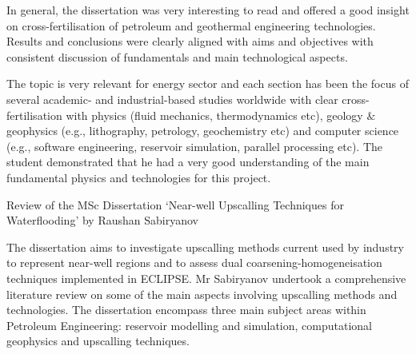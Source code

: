 \documentclass[14pt,twoside]{report}
\begin{document}
In general, the dissertation was very interesting to read and offered a good insight on cross-fertilisation of petroleum and geothermal engineering technologies. Results and conclusions were clearly aligned with aims and objectives with consistent discussion of fundamentals and main technological aspects. 

The topic is very relevant for energy sector and each section has been the focus of several academic- and industrial-based studies worldwide with clear cross-fertilisation with physics (fluid mechanics, thermodynamics etc), geology $\&$ geophysics (e.g., lithography, petrology, geochemistry etc) and computer science (e.g., software engineering, reservoir simulation, parallel processing etc). The student demonstrated that he had a very good understanding of the main fundamental physics and technologies for this project.


\clearpage


\bigskip

\begin{center}
{\Large Review of the MSc Dissertation `Near-well Upscalling Techniques for Waterflooding' by Raushan Sabiryanov}
\end{center}

\medskip

The dissertation aims to investigate upscalling methods current used by industry to represent near-well regions and to assess dual coarsening-homogeneisation techniques implemented in ECLIPSE. Mr Sabiryanov undertook a comprehensive literature review on some of the main aspects involving upscalling methods and technologies. The dissertation encompass three main subject areas within Petroleum Engineering: reservoir modelling and simulation, computational geophysics and upscalling techniques.
\end{document}
